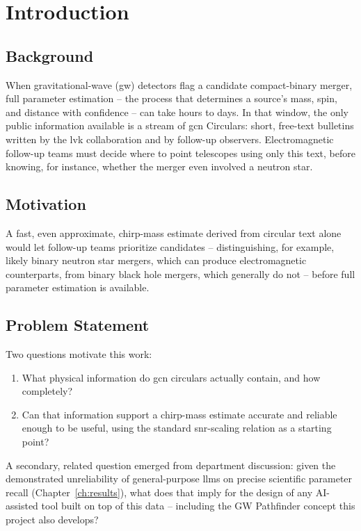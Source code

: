 \chapter{Introduction}
\label{ch:introduction}

\section{Background}

When gravitational-wave (\gls{gw}) detectors flag a candidate compact-binary merger, full parameter estimation -- the process that determines a source's mass, spin, and distance with confidence -- can take hours to days. In that window, the only public information available is a stream of \gls{gcn} Circulars: short, free-text bulletins written by the \gls{lvk} collaboration and by follow-up observers. Electromagnetic follow-up teams must decide where to point telescopes using only this text, before knowing, for instance, whether the merger even involved a neutron star.

\section{Motivation}

A fast, even approximate, chirp-mass estimate derived from circular text alone would let follow-up teams prioritize candidates -- distinguishing, for example, likely binary neutron star mergers, which can produce electromagnetic counterparts, from binary black hole mergers, which generally do not -- before full parameter estimation is available.

\section{Problem Statement}

Two questions motivate this work:

\begin{enumerate}
    \item What physical information do \gls{gcn} circulars actually contain, and how completely?
    \item Can that information support a chirp-mass estimate accurate and reliable enough to be useful, using the standard \gls{snr}-scaling relation as a starting point?
\end{enumerate}

A secondary, related question emerged from department discussion: given the demonstrated unreliability of general-purpose \glspl{llm} on precise scientific parameter recall (Chapter~\ref{ch:results}), what does that imply for the design of any AI-assisted tool built on top of this data -- including the GW Pathfinder concept this project also develops?

